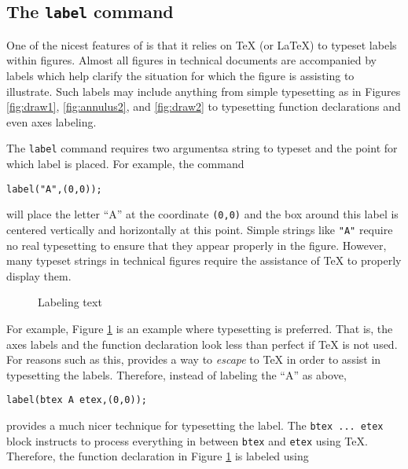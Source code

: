 \subsection{The \texttt{label} command}

One of the nicest features of \MP{} is that it relies on \TeX{} (or
\LaTeX) to typeset labels within figures.  Almost all figures in
technical documents are accompanied by labels which help clarify the
situation for which the figure is assisting to illustrate.  Such labels
may include anything from simple typesetting as in Figures
\ref{fig:draw1}, \ref{fig:annulus2}, and \ref{fig:draw2} to typesetting
function declarations and even axes labeling.

The \texttt{label} command requires two arguments\Dash a string to
typeset and the point for which label is placed.  For example, the
command

\begin{center}
  \verb|label("A",(0,0));|
\end{center}

will place the letter ``A'' at the coordinate \texttt{(0,0)} and the box
around this label is centered vertically and horizontally at this point.
Simple strings like \texttt{"A"} require no real typesetting to ensure
that they appear properly in the figure.  However, many typeset strings
in technical figures require the assistance of \TeX{} to properly
display them.

\begin{figure}[hptb]
	\begin{center}
  \end{center}
	\caption{Labeling text}
  \label{fig:parabola}
\end{figure}

For example, Figure \ref{fig:parabola} is an example where typesetting
is preferred.  That is, the axes labels and the function declaration
look less than perfect if \TeX{} is not used.  For reasons such as this,
\MP{} provides a way to \textit{escape} to \TeX{} in order to assist in
typesetting the labels.  Therefore, instead of labeling the ``A'' as
above,

\begin{center}
  \verb|label(btex A etex,(0,0));|
\end{center}

provides a much nicer technique for typesetting the label.  The
\texttt{btex\,...\,etex} block instructs \MP{} to process everything in
between \texttt{btex} and \texttt{etex} using \TeX.  Therefore, the
function declaration in Figure \ref{fig:parabola} is labeled using

